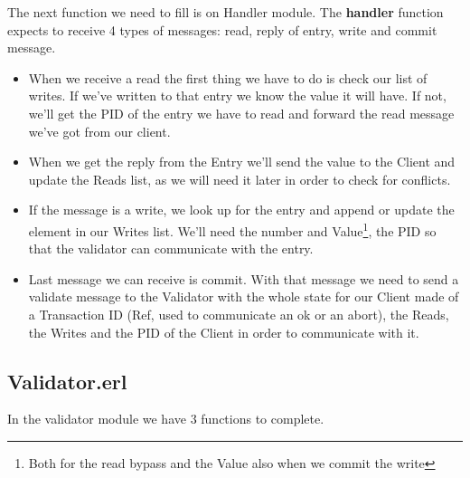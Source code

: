 \documentclass[a4paper, 10pt]{article}
\begin{document}
The next function we need to fill is on Handler module. The \textbf{handler} function expects to receive 4 types of messages: read, reply of entry, write and commit message.

\begin{itemize}
    \item When we receive a read the first thing we have to do is check our list of writes. If we've written to that entry we know the value it will have. If not, we'll get the PID of the entry we have to read and forward the read message we've got from our client. 

  \item When we get the reply from the Entry we'll send the value to the Client and update the Reads list, as we will need it later in order to check for conflicts.
  \item If the message is a write, we look up for the entry and append or update the element in our Writes list. We'll need the number and Value\footnote{Both for the read bypass and the Value also when we commit the write}, the PID so that the validator can communicate with the entry.
  \item Last message we can receive is commit. With that message we need to send a validate message to the Validator with the whole state for our Client made of a Transaction ID (Ref, used to communicate an ok or an abort), the Reads, the Writes and the PID of the Client in order to communicate with it.
\end{itemize}

\clearpage
\subsection{Validator.erl}

In the validator module we have 3 functions to complete. 
\end{document}
